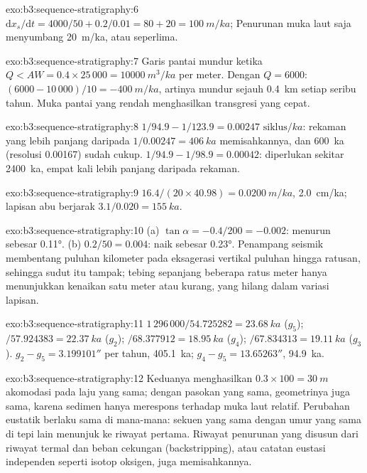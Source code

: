 \begin{solution}{exo:b3:sequence-stratigraphy:6}
$\mathrm dx_s/\mathrm dt = 4000/50 + 0.2/0.01 = 80 + 20 = \qty{100}{m/ka}$;
Penurunan muka laut saja menyumbang \qty{20}{m/ka}, atau seperlima.
\end{solution}

\begin{solution}{exo:b3:sequence-stratigraphy:7}
Garis pantai mundur ketika $Q < AW = 0.4\times25\,000 = \qty{10000}{m^3/ka}$ per
meter. Dengan $Q = 6000$: $(6000 - 10\,000)/10 = \qty{-400}{m/ka}$, artinya mundur
sejauh \qty{0.4}{km} setiap seribu tahun. Muka pantai yang rendah menghasilkan
transgresi yang cepat.
\end{solution}

\begin{solution}{exo:b3:sequence-stratigraphy:8}
$1/94.9 - 1/123.9 = \num{0.00247}\text{ siklus}/\unit{ka}$: rekaman yang lebih panjang daripada
$1/0.00247 = \qty{406}{ka}$ memisahkannya, dan \qty{600}{ka} (resolusi
0.00167) sudah cukup. $1/94.9 - 1/98.9 = 0.00042$: diperlukan sekitar
\qty{2400}{ka}, empat kali lebih panjang daripada rekaman.
\end{solution}

\begin{solution}{exo:b3:sequence-stratigraphy:9}
$16.4/(20\times40.98) = \qty{0.0200}{m/ka}$, \qty{2.0}{cm/ka}; lapisan abu
berjarak $3.1/0.020 = \qty{155}{ka}$.
\end{solution}

\begin{solution}{exo:b3:sequence-stratigraphy:10}
(a) $\tan\alpha = -0.4/200 = -0.002$: menurun sebesar \ang{0.11}. (b)
$0.2/50 = 0.004$: naik sebesar \ang{0.23}. Penampang seismik membentang puluhan
kilometer pada eksagerasi vertikal puluhan hingga ratusan, sehingga sudut itu tampak;
tebing sepanjang beberapa ratus meter hanya menunjukkan kenaikan satu meter atau kurang, yang
hilang dalam variasi lapisan.
\end{solution}

\begin{solution}{exo:b3:sequence-stratigraphy:11}
$1\,296\,000/54.725282 = \qty{23.68}{ka}$ ($g_5$); $/57.924383 =
\qty{22.37}{ka}$ ($g_2$); $/68.377912 = \qty{18.95}{ka}$ ($g_4$);
$/67.834313 = \qty{19.11}{ka}$ ($g_3$). $g_2 - g_5 = 3.199101''$ per tahun,
\qty{405.1}{ka}; $g_4 - g_5 = 13.65263''$, \qty{94.9}{ka}.
\end{solution}

\begin{solution}{exo:b3:sequence-stratigraphy:12}
Keduanya menghasilkan $0.3\times100 = \qty{30}{m}$ akomodasi pada laju yang sama; dengan
pasokan yang sama, geometrinya juga sama, karena sedimen hanya merespons terhadap
muka laut relatif. Perubahan eustatik berlaku sama di mana-mana:
sekuen yang sama dengan umur yang sama di tepi lain menunjuk ke riwayat pertama. Riwayat
penurunan yang disusun dari riwayat termal dan beban cekungan
(backstripping), atau catatan eustasi independen seperti isotop oksigen,
juga memisahkannya.
\end{solution}

